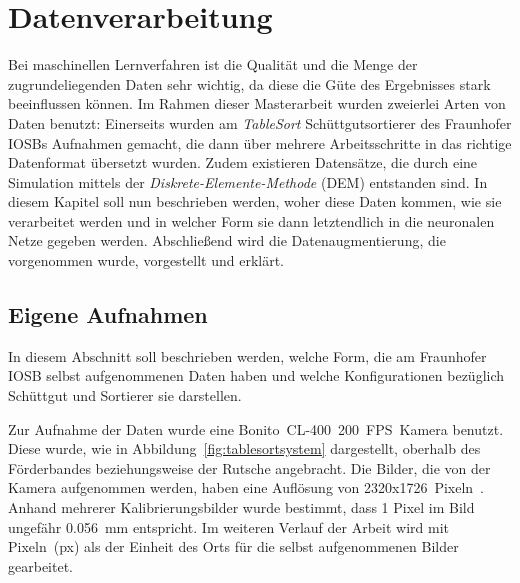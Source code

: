 \chapter{Datenverarbeitung}
\label{cap:data}

Bei maschinellen Lernverfahren ist die Qualität und die Menge der zugrundeliegenden Daten sehr wichtig,
da diese die Güte des Ergebnisses stark beeinflussen können.
Im Rahmen dieser Masterarbeit wurden zweierlei Arten von Daten benutzt:
Einerseits wurden am \textit{TableSort} Schüttgutsortierer des Fraunhofer IOSBs Aufnahmen gemacht, 
die dann über mehrere Arbeitsschritte in das richtige Datenformat übersetzt wurden.
Zudem existieren Datensätze, die durch eine Simulation mittels der \textit{Diskrete-Elemente-Methode} (DEM) entstanden sind. 
In diesem Kapitel soll nun beschrieben werden, woher diese Daten kommen, wie sie verarbeitet werden 
und in welcher Form sie dann letztendlich in die neuronalen Netze gegeben werden.
Abschließend wird die Datenaugmentierung, die vorgenommen wurde, vorgestellt und erklärt.





\section{Eigene Aufnahmen}

In diesem Abschnitt soll beschrieben werden, welche Form, die am Fraunhofer IOSB selbst aufgenommenen Daten haben und welche Konfigurationen bezüglich Schüttgut und Sortierer sie darstellen.





Zur Aufnahme der Daten wurde eine Bonito~CL-400~200~FPS~Kamera benutzt. 
Diese wurde, wie in Abbildung~\ref{fig:tablesortsystem} dargestellt, oberhalb des Förderbandes beziehungsweise der Rutsche angebracht.
Die Bilder, die von der Kamera aufgenommen werden, haben eine Auflösung von 2320x1726~Pixeln~\cite{alliedvisiontechnologiesgmbh2014}.
Anhand mehrerer Kalibrierungsbilder wurde bestimmt, dass 1 Pixel im Bild ungefähr \SI{0.056}{\milli\meter} entspricht.
Im weiteren Verlauf der Arbeit wird mit Pixeln~(px) als der Einheit des Orts für die selbst aufgenommenen Bilder gearbeitet.

